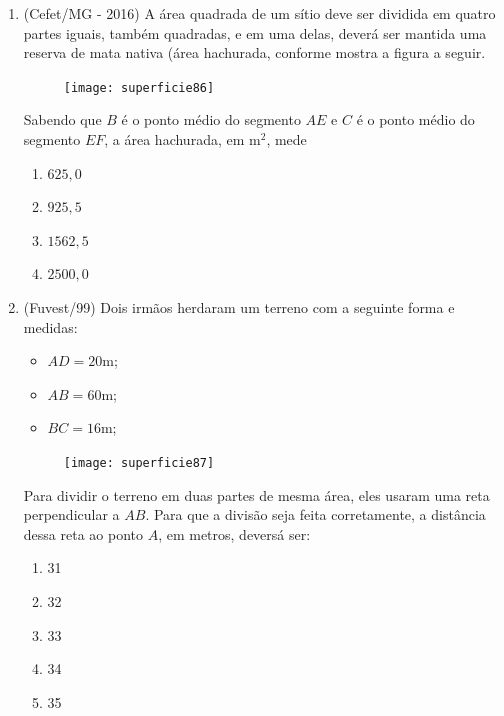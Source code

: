 \begin{enumerate}
  \item (Cefet/MG - 2016) A área quadrada de um sítio deve ser dividida em quatro partes iguais, também quadradas, e em uma delas, deverá ser mantida uma reserva de mata nativa (área hachurada, conforme mostra a figura a seguir. 
  \begin{figure}[H]
  \centering
  \texttt{[image: superficie86]}

  \end{figure} 

  Sabendo que $B$ é o ponto médio do segmento $AE$ e $C$ é o ponto médio do segmento $EF$, a área hachurada, em m$^2$, mede
  \begin{enumerate}
    \item $625{,}0$
    \item $925{,}5$
    \item $1562{,}5$
    \item $2500{,}0$
  \end{enumerate}

\clearpage

  \item (Fuvest/99) Dois irmãos herdaram um terreno com a seguinte forma e medidas:

  \begin{multicols}{2}
  \begin{itemize}[label=]
    \item $AD=20\text{m}$;
    \item $AB=60\text{m}$;
    \item $BC=16\text{m}$;
  \end{itemize}

  \begin{figure}[H]
  \centering

  \texttt{[image: superficie87]}
  \end{figure}
 
  \end{multicols}
   Para dividir o terreno em duas partes de mesma área, eles usaram uma reta perpendicular a $AB$. Para que a divisão seja feita corretamente, a distância dessa reta ao ponto $A$, em metros, deversá ser:
  \begin{enumerate}
    \item 31
    \item 32
    \item 33
    \item 34
    \item 35
  \end{enumerate}


\end{enumerate}
